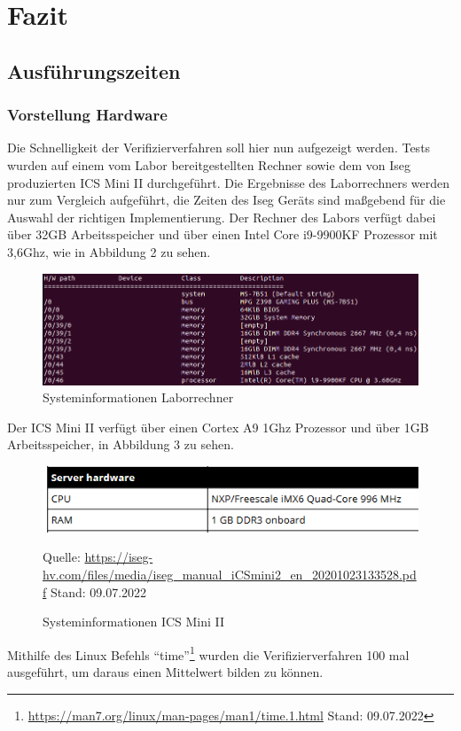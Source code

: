 \documentclass[thesis=bachelor,faculty=cb]{hsmw-thesis}
\begin{document}
{\chapter{Fazit}
\section{Ausführungszeiten}
\subsection{Vorstellung Hardware}
Die Schnelligkeit der Verifizierverfahren soll hier nun aufgezeigt werden. Tests wurden auf einem vom Labor bereitgestellten Rechner sowie dem von Iseg produzierten ICS Mini II durchgeführt. Die Ergebnisse des Laborrechners werden nur zum Vergleich aufgeführt, die Zeiten des Iseg Geräts sind maßgebend für die Auswahl der richtigen Implementierung. Der Rechner des Labors verfügt dabei über 32GB Arbeitsspeicher und über einen Intel Core i9-9900KF Prozessor mit 3,6Ghz, wie in Abbildung 2 zu sehen.
\begin{figure}[H]
	\centering
	\includegraphics[scale=0.6]{images/Uni_Prozessor.PNG}
	\caption{Systeminformationen Laborrechner}
\end{figure}
Der ICS Mini II verfügt über einen Cortex A9 1Ghz Prozessor und über 1GB Arbeitsspeicher, in Abbildung 3 zu sehen.
\begin{figure}[H]
	\centering
	\includegraphics[scale=0.8]{images/Iseg_Prozessor.PNG}
	\caption{Systeminformationen ICS Mini II}{Quelle: \url{https://iseg-hv.com/files/media/iseg_manual_iCSmini2_en_20201023133528.pdf} Stand: 09.07.2022}
\end{figure}
\noindent
Mithilfe des Linux Befehls \enquote{time}\footnote{\url{https://man7.org/linux/man-pages/man1/time.1.html} Stand: 09.07.2022} wurden die Verifizierverfahren 100 mal ausgeführt, um daraus einen Mittelwert bilden zu können.
}
\end{document}
